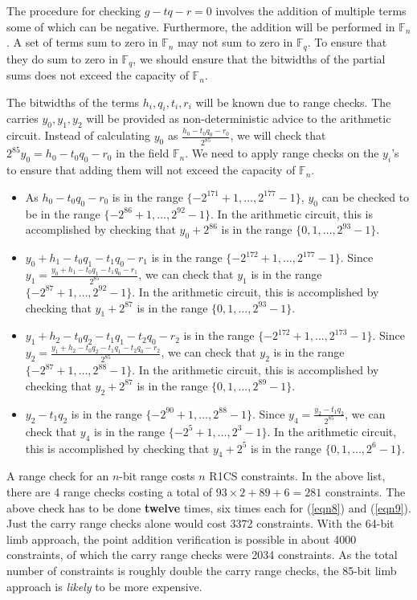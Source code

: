 \documentclass[a4paper, 12pt]{article}
\begin{document}
The procedure for checking $g-tq-r =0$ involves the addition of multiple terms some of which can be negative. Furthermore, the addition will be performed in $\mathbb{F}_n$. A set of terms sum to zero in $\mathbb{F}_n$ may not sum to zero in $\mathbb{F}_q$. To ensure that they do sum to zero in $\mathbb{F}_q$, we should ensure that the bitwidths of the partial sums does not exceed the capacity of $\mathbb{F}_n$.

The bitwidths of the terms $h_i, q_i, t_i, r_i$ will be known due to range checks. The carries $y_0,y_1,y_2$ will be provided as non-deterministic advice to the arithmetic circuit. Instead of calculating $y_0$ as $\frac{h_0-t_0q_0-r_0}{2^{85}}$, we will check that $2^{85}y_0 = h_0-t_0q_0-r_0$ in the field $\mathbb{F}_n$. We need to apply range checks on the $y_i$'s to ensure that adding them will not exceed the capacity of $\mathbb{F}_n$.

\begin{itemize}
  \item As $h_0 - t_0q_0-r_0$ is in the range $\{-2^{171}+1,\ldots, 2^{177}-1\}$, $y_0$ can be checked to be in the range $\{-2^{86}+1,\ldots, 2^{92}-1\}$. In the arithmetic circuit, this is accomplished by checking that $y_0 + 2^{86}$ is in the range $\{0,1,\ldots,2^{93}-1\}$.
  \item $y_0+h_1-t_0q_1-t_1q_0-r_1$ is in the range $\{-2^{172}+1,\ldots, 2^{177}-1\}$. Since $y_1 = \frac{y_0+h_1-t_0q_1-t_1q_0-r_1}{2^{85}}$, we can check that $y_1$ is in the range $\{-2^{87}+1,\ldots, 2^{92}-1\}$. In the arithmetic circuit, this is accomplished by checking that $y_1 + 2^{87}$ is in the range $\{0,1,\ldots,2^{93}-1\}$.
  \item $y_1+h_2-t_0q_2-t_1q_1-t_2q_0-r_2$ is in the range $\{-2^{172}+1,\ldots, 2^{173}-1\}$. Since $y_2 = \frac{y_1+h_2-t_0q_2-t_1q_1-t_2q_0-r_2}{2^{85}}$, we can check that $y_2$ is in the range $\{-2^{87}+1,\ldots, 2^{88}-1\}$. In the arithmetic circuit, this is accomplished by checking that $y_2 + 2^{87}$ is in the range $\{0,1,\ldots,2^{89}-1\}$.
  \item $y_2-t_1q_2$ is in the range $\{-2^{90}+1,\ldots, 2^{88}-1\}$. Since $y_4 = \frac{y_2-t_1q_2}{2^{85}}$, we can check that $y_4$ is in the range $\{-2^{5}+1,\ldots, 2^{3}-1\}$. In the arithmetic circuit, this is accomplished by checking that $y_4 + 2^{5}$ is in the range $\{0,1,\ldots,2^{6}-1\}$.
\end{itemize}

A range check for an $n$-bit range costs $n$ R1CS constraints. In the above list, there are 4 range checks costing a total of $93 \times 2 + 89 + 6 = 281$ constraints. The above check has to be done \textbf{twelve} times, six times each for (\ref{eqn8}) and (\ref{eqn9}). Just the carry range checks alone would cost 3372 constraints. With the 64-bit limb approach, the point addition verification is possible in about 4000 constraints, of which the carry range checks were 2034 constraints. As the total number of constraints is roughly double the carry range checks, the 85-bit limb approach is \textit{likely} to be more expensive.
\end{document}
